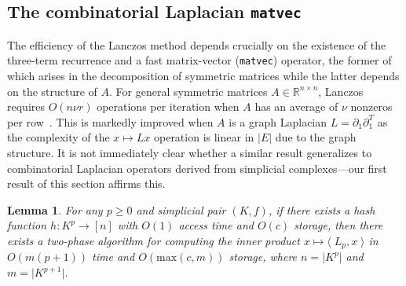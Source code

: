 \documentclass[10pt]{article}
\numberwithin{equation}{section}
\newcommand{\+}{%
	\raisebox{0.18ex}{\scaleobj{0.55}{+}}
}
\newtheorem{lemma}{Lemma}
\theoremstyle{definition}
\theoremstyle{definition}
\begin{document}
\subsection{The combinatorial Laplacian \texttt{matvec}}\label{sec:comb_lap}
The efficiency of the Lanczos method depends crucially on the existence of the three-term recurrence and a fast matrix-vector (\texttt{matvec}) operator, the former of which arises in the decomposition of symmetric matrices while the latter depends on the structure of $A$. 
For general symmetric matrices $A \in \mathbb{R}^{n \times n}$, Lanczos requires $O(n\nu r)$ operations per iteration when $A$ has an average of $\nu$ nonzeros per row~\cite{golub2013matrix}. 
This is markedly improved when $A$ is a graph Laplacian $L = \partial_1 \partial_1^T$ as the complexity of the $x \mapsto L x$ operation is linear in $\lvert E \rvert$ due to the graph structure.
It is not immediately clear whether a similar result generalizes to combinatorial Laplacian operators derived from simplicial complexes---our first result of this section affirms this.
\begin{lemma}\label{lemma:matvec_lap}
	For any $p \geq 0$ and simplicial pair $(K, f)$, if there exists a hash function $h: K^p \to [n]$ with $O(1)$ access time and $O(c)$ storage, then there exists a two-phase algorithm for computing the inner product $x \mapsto \langle \; L_p, x	\; \rangle$ in $O(m(p+1))$ time and $O(\mathrm{max}(c,m))$ storage, where $n = \lvert K^p \rvert$ and $m = \lvert K^{p+1} \rvert$. 
\end{lemma}
\end{document}
